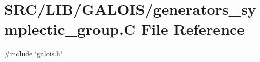\hypertarget{generators__symplectic__group_8_c}{}\section{S\+R\+C/\+L\+I\+B/\+G\+A\+L\+O\+I\+S/generators\+\_\+symplectic\+\_\+group.C File Reference}
\label{generators__symplectic__group_8_c}
{\ttfamily \#include \char`\"{}galois.\+h\char`\"{}}\newline
